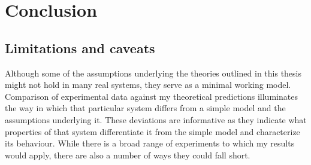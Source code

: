 \chapter{Conclusion}



\section{Limitations and caveats}
Although some of the assumptions underlying the theories outlined in this thesis might not hold in many real systems, they serve as a minimal working model. %
Comparison of experimental data against my theoretical predictions illuminates the way in which that particular system differs from a simple model and the assumptions underlying it. 
These deviations are informative as they indicate what properties of that system differentiate it from the simple model and characterize its behaviour. 
While there is a broad range of experiments to which my results would apply, there are also a number of ways they could fall short. %

